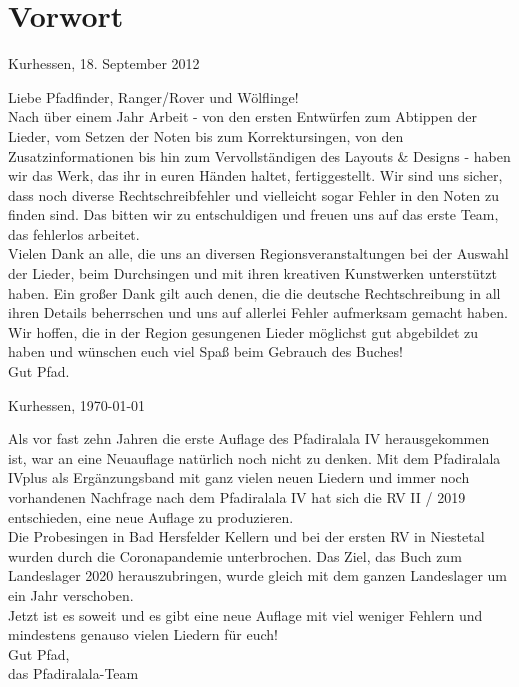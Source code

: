 \section*{Vorwort}

\begin{flushright} 
Kurhessen, 18. September 2012
\end{flushright}

Liebe Pfadfinder, Ranger/Rover und Wölflinge! \\ 

Nach über einem Jahr Arbeit - von den ersten Entwürfen zum Abtippen der Lieder, vom Setzen der Noten bis zum Korrektursingen, von den Zusatzinformationen bis hin zum Vervollständigen des Layouts \& Designs - haben wir das Werk, das ihr in euren Händen haltet, fertiggestellt. Wir sind uns sicher, dass noch diverse Rechtschreibfehler und vielleicht sogar Fehler in den Noten zu finden sind. Das bitten wir zu entschuldigen und freuen uns auf das erste Team, das fehlerlos arbeitet. \\ 

Vielen Dank an alle, die uns an diversen Regionsveranstaltungen bei der Auswahl der Lieder, beim Durchsingen und mit ihren kreativen Kunstwerken unterstützt haben. Ein großer Dank gilt auch denen, die die deutsche Rechtschreibung in all ihren Details beherrschen und uns auf allerlei Fehler aufmerksam gemacht haben. \\

Wir hoffen, die in der Region gesungenen Lieder möglichst gut abgebildet zu haben und wünschen euch viel Spaß beim Gebrauch des Buches! \\ 

Gut Pfad.

\begin{flushright} 
Kurhessen, \today
\end{flushright}

Als vor fast zehn Jahren die erste Auflage des Pfadiralala IV herausgekommen ist, war an eine Neuauflage natürlich noch nicht zu denken. Mit dem Pfadiralala IVplus als Ergänzungsband mit ganz vielen neuen Liedern und immer noch vorhandenen Nachfrage nach dem Pfadiralala IV hat sich die RV II / 2019 entschieden, eine neue Auflage zu produzieren. \\

Die Probesingen in Bad Hersfelder Kellern und bei der ersten RV in Niestetal wurden durch die Coronapandemie unterbrochen. Das Ziel, das Buch zum Landeslager 2020 herauszubringen, wurde gleich mit dem ganzen Landeslager um ein Jahr verschoben. \\

Jetzt ist es soweit und es gibt eine neue Auflage mit viel weniger Fehlern und mindestens genauso vielen Liedern für euch! \\

Gut Pfad, \\
das Pfadiralala-Team
